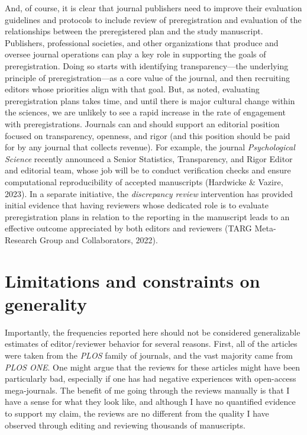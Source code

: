 \documentclass[authordate, empirical]{jote-new-article}
\begin{document}
	And, of course, it is clear that journal publishers need to improve their evaluation guidelines and protocols to include review of preregistration and evaluation of the relationships between the preregistered plan and the study manuscript. Publishers, professional societies, and other organizations that produce and oversee journal operations can play a key role in supporting the goals of preregistration. Doing so starts with identifying transparency—the underlying principle of preregistration—as a core value of the journal, and then recruiting editors whose priorities align with that goal. But, as noted, evaluating preregistration plans takes time, and until there is major cultural change within the sciences, we are unlikely to see a rapid increase in the rate of engagement with preregistrations. Journals can and should support an editorial position focused on transparency, openness, and rigor (and this position should be paid for by any journal that collects revenue). For example, the journal \emph{Psychological Science} recently announced a Senior Statistics, Transparency, and Rigor Editor and editorial team, whose job will be to conduct verification checks and ensure computational reproducibility of accepted manuscripts (Hardwicke \& Vazire, 2023). In a separate initiative, the \emph{discrepancy review} intervention has provided initial evidence that having reviewers whose dedicated role is to evaluate preregistration plans in relation to the reporting in the manuscript leads to an effective outcome appreciated by both editors and reviewers (TARG Meta-Research Group and Collaborators, 2022).



	\section{\textbf{Limitations and constraints on generality}}



	Importantly, the frequencies reported here should not be considered generalizable estimates of editor/reviewer behavior for several reasons. First, all of the articles were taken from the \emph{PLOS} family of journals, and the vast majority came from \emph{PLOS ONE}. One might argue that the reviews for these articles might have been particularly bad, especially if one has had negative experiences with open-access mega-journals. The benefit of me going through the reviews manually is that I have a sense for what they look like, and although I have no quantified evidence to support my claim, the reviews are no different from the quality I have observed through editing and reviewing thousands of manuscripts.
\end{document}
